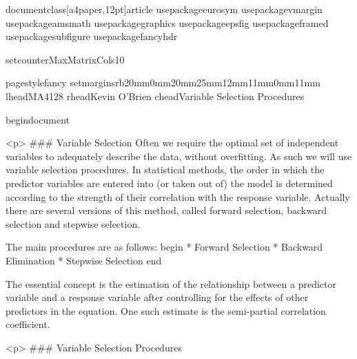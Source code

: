 documentclass[a4paper,12pt]{article}
usepackage{eurosym}
usepackage{vmargin}
usepackage{amsmath}
usepackage{graphics}
usepackage{epsfig}
usepackage{framed}
usepackage{subfigure}
usepackage{fancyhdr}

setcounter{MaxMatrixCols}{10}

pagestyle{fancy}
setmarginsrb{20mm}{0mm}{20mm}{25mm}{12mm}{11mm}{0mm}{11mm}
lhead{MA4128} rhead{Kevin O'Brien} chead{Variable Selection Procedures} %

begin{document}


<p>
### {Variable Selection}
Often we require the optimal set of independent variables to adequately describe the data, without overfitting. As such we will use variable selection procedures. In statistical methods, the order in which the predictor variables are entered into (or taken out of) the model is determined according to the strength of their correlation with the response variable. Actually there are several versions of this method, called forward selection, backward selection and stepwise selection.

The main procedures are as follows:
begin{ }
	         * Forward Selection
	         * Backward Elimination
	         * Stepwise Selection
end{ }

The essential concept is the estimation of the relationship between a predictor
variable and a response variable after controlling for the effects of other
predictors in the equation. One such estimate is the semi-partial correlation coefficient.


<p>
### {Variable Selection Procedures}

